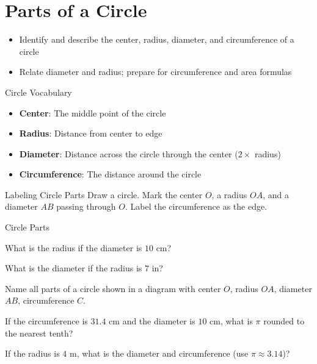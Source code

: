 \section{Parts of a Circle}

\begin{learningGoals}
\begin{itemize}
    \item Identify and describe the center, radius, diameter, and circumference of a circle
    \item Relate diameter and radius; prepare for circumference and area formulas
\end{itemize}
\end{learningGoals}

\begin{conceptBox}{Circle Vocabulary}
\begin{itemize}[leftmargin=*]
    \item \textbf{Center}: The middle point of the circle
    \item \textbf{Radius}: Distance from center to edge
    \item \textbf{Diameter}: Distance across the circle through the center ($2 \times$ radius)
    \item \textbf{Circumference}: The distance around the circle
\end{itemize}
\end{conceptBox}

\begin{workedExample}{Labeling Circle Parts}
Draw a circle. Mark the center $O$, a radius $OA$, and a diameter $AB$ passing through $O$. Label the circumference as the edge.
\end{workedExample}


\begin{practiceBox}{Circle Parts}
\resetProblems

\prob What is the radius if the diameter is $10$ cm?

\prob What is the diameter if the radius is $7$ in?

\prob Name all parts of a circle shown in a diagram with center $O$, radius $OA$, diameter $AB$, circumference $C$.

\prob If the circumference is $31.4$ cm and the diameter is $10$ cm, what is $\pi$ rounded to the nearest tenth?

\prob If the radius is $4$ m, what is the diameter and circumference (use $\pi \approx 3.14$)?

\end{practiceBox}
